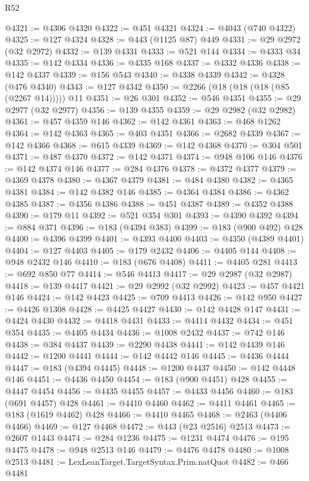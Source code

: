 \begin{lexlean}{R52}
\begin{coremodule}
@4321 := @4306 @4320
@4322 := @451 @4321
@4324 := @4043 (@740 @4322)
@4325 := @127 @4324
@4328 := @443 (@1125 @87) @449
@4331 := @29 @2972 (@32 @2972)
@4332 := @139 @4331
@4333 := @521 @144
@4334 := @4333 @34
@4335 := @142 @4334
@4336 := @4335 @168
@4337 := @4332 @4336
@4338 := @142 @4337
@4339 := @156 @543
@4340 := @4338 @4339
@4342 := @4328 (@476 @4340)
@4343 := @127 @4342
@4350 := @2266 (@18 (@18 (@18 (@85 (@2267 @14))))) @11
@4351 := @26 @301
@4352 := @546 @4351
@4355 := @29 @2977 (@32 @2977)
@4356 := @139 @4355
@4359 := @29 @2982 (@32 @2982)
@4361 := @457 @4359 @146
@4362 := @142 @4361
@4363 := @468 @1262
@4364 := @142 @4363
@4365 := @403 @4351
@4366 := @2682 @4339
@4367 := @142 @4366
@4368 := @615 @4339
@4369 := @142 @4368
@4370 := @304 @501
@4371 := @487 @4370
@4372 := @142 @4371
@4374 := @948 @106 @146
@4376 := @142 @4374 @146
@4377 := @284 @4376
@4378 := @4372 @4377
@4379 := @4369 @4378
@4380 := @4367 @4379
@4381 := @484 @4380
@4382 := @4365 @4381
@4384 := @142 @4382 @146
@4385 := @4364 @4384
@4386 := @4362 @4385
@4387 := @4356 @4386
@4388 := @451 @4387
@4389 := @4352 @4388
@4390 := @179 @11
@4392 := @521 @354 @301
@4393 := @4390 @4392
@4394 := @884 @371
@4396 := @183 (@4394 @383)
@4399 := @183 (@900 @492) @428
@4400 := @4396 @4399
@4401 := @4393 @4400
@4403 := @4350 (@4389 @4401)
@4404 := @127 @4403
@4405 := @179 @2432
@4406 := @4405 @144
@4408 := @948 @2432 @146
@4410 := @183 (@676 @4408)
@4411 := @4405 @281
@4413 := @692 @850 @77
@4414 := @546 @4413
@4417 := @29 @2987 (@32 @2987)
@4418 := @139 @4417
@4421 := @29 @2992 (@32 @2992)
@4423 := @457 @4421 @146
@4424 := @142 @4423
@4425 := @709 @4413
@4426 := @142 @950
@4427 := @4426 @1308
@4428 := @4425 @4427
@4430 := @142 @4428 @147
@4431 := @4424 @4430
@4432 := @4418 @4431
@4433 := @4414 @4432
@4434 := @451 @354
@4435 := @4405 @4434
@4436 := @1008 @2432
@4437 := @742 @146
@4438 := @384 @4437
@4439 := @2290 @4438
@4441 := @142 @4439 @146
@4442 := @1200 @4441
@4444 := @142 @4442 @146
@4445 := @4436 @4444
@4447 := @183 (@4394 @4445)
@4448 := @1200 @4437
@4450 := @142 @4448 @146
@4451 := @4436 @4450
@4454 := @183 (@900 @4451) @428
@4455 := @4447 @4454
@4456 := @4435 @4455
@4457 := @4433 @4456
@4460 := @183 (@691 @4457) @428
@4461 := @4410 @4460
@4462 := @4411 @4461
@4465 := @183 (@1619 @4462) @428
@4466 := @4410 @4465
@4468 := @2463 (@4406 @4466)
@4469 := @127 @4468
@4472 := @443 (@23 @2516) @2513
@4473 := @2607 @1443
@4474 := @284 @1236
@4475 := @1231 @4474
@4476 := @195 @4475
@4478 := @948 @2513 @146
@4479 := @4476 @4478
@4480 := @1008 @2513
@4481 := LexLeanTarget.TargetSyntax.Prim.natQuot
@4482 := @466 @4481

\end{coremodule}
\end{lexlean}
